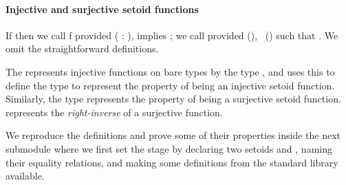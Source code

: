 \paragraph*{Injective and surjective setoid functions}
If  %
then we call \ab f  provided
 (  \as : ),       
implies   ; we call   provided
 (), ~() such that     .
\ifshort
We omit the straightforward \agda definitions.
\else

The \agdastdlib represents injective functions on bare types by the
type , and uses this to define the  type to represent
the property of being an injective setoid function. Similarly, the type 
represents the property of being a surjective setoid function.  represents the \emph{right-inverse} of a surjective function.

We reproduce the definitions and prove some of their properties
inside the next submodule where we first set the stage by declaring two
setoids  and , naming their equality relations, and making some
definitions from the standard library available.

